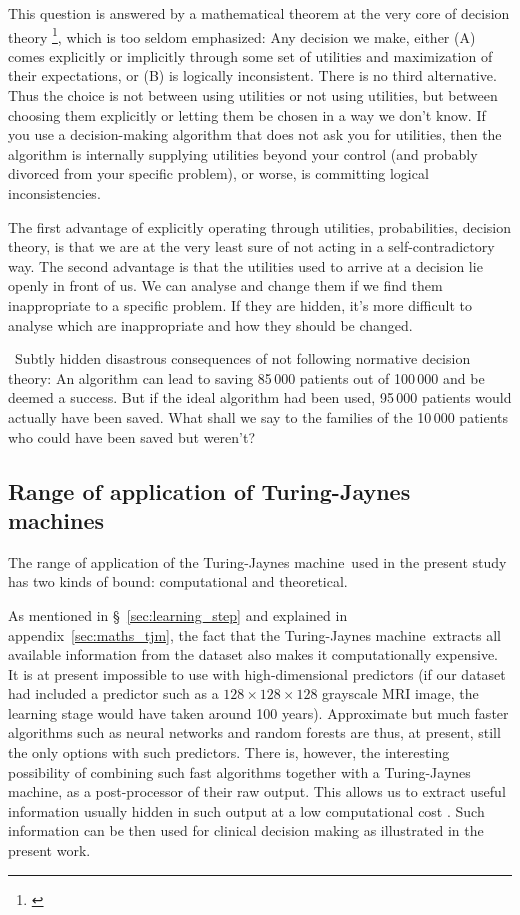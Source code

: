 \documentclass[utf8]{FrontiersinHarvard} %
\newcommand*{\pencil}{{\fontencoding{U}\fontfamily{fontawesometwo}\selectfont\symbol{210}}}
\newcommand{\mynotep}[1]{{\color{notecolour}\pencil\ #1}}
\newcommand*{\sect}{\S}%
\renewcommand*{\|}[1][]{\nonscript\:#1\vert\nonscript\:\mathopen{}}
\newcommand*{\tjm}{Turing-Jaynes machine}
\begin{document}
This question is answered by a mathematical theorem at the very core of decision theory \footnote{\citealp{savage1954_r1972,luceetal1957,raiffaetal1961_r2000,atkinsonetal1964,ferguson1967,lindley1971_r1988,kreps1988,bernardoetal1994_r2000,prattetal1995_r1996,pettigrew2011_r2019}}, which is too seldom emphasized: Any decision we make, either (A) comes explicitly or implicitly through some set of utilities and maximization of their expectations, or (B) is logically inconsistent. There is no third alternative. Thus the choice is not between using utilities or not using utilities, but between choosing them explicitly or letting them be chosen in a way we don't know. If you use a decision-making algorithm that does not ask you for utilities, then the algorithm is internally supplying utilities beyond your control (and probably divorced from your specific problem), or worse, is committing logical inconsistencies.

The first advantage of explicitly operating through utilities, probabilities, decision theory, is that we are at the very least sure of not acting in a self-contradictory way. The second advantage is that the utilities used to arrive at a decision lie openly in front of us. We can analyse and change them if we find them inappropriate to a specific problem. If they are hidden, it's more difficult to analyse which are inappropriate and how they should be changed.

\mynotep{Subtly hidden disastrous consequences of not following normative decision theory: An algorithm can lead to saving 85\,000 patients out of 100\,000 and be deemed a success. But if the ideal algorithm had been used, 95\,000 patients would actually have been saved. What shall we say to the families of the 10\,000 patients who could have been saved but weren't?}

\subsection{Range of application of \tjm s}
\label{sec:rangeTJM}

The range of application of the \tjm\ used in the present study has two kinds of bound: computational and theoretical.

As mentioned in \sect~\ref{sec:learning_step} and explained in appendix~\ref{sec:maths_tjm}, the fact that the \tjm\ extracts all available information from the dataset also makes it computationally expensive. It is at present impossible to use with high-dimensional predictors (if our dataset had included a predictor such as a $128\times128\times128$ grayscale MRI image, the learning stage would have taken around 100 years). Approximate but much faster algorithms such as neural networks and random forests are thus, at present, still the only options with such predictors. There is, however, the interesting possibility of combining such fast algorithms together with a \tjm, as a post-processor of their raw output. This allows us to extract useful information usually hidden in such output at a low computational cost \citep{dyrlandetal2022b}. Such information can be then used for clinical decision making as illustrated in the present work.
\end{document}
